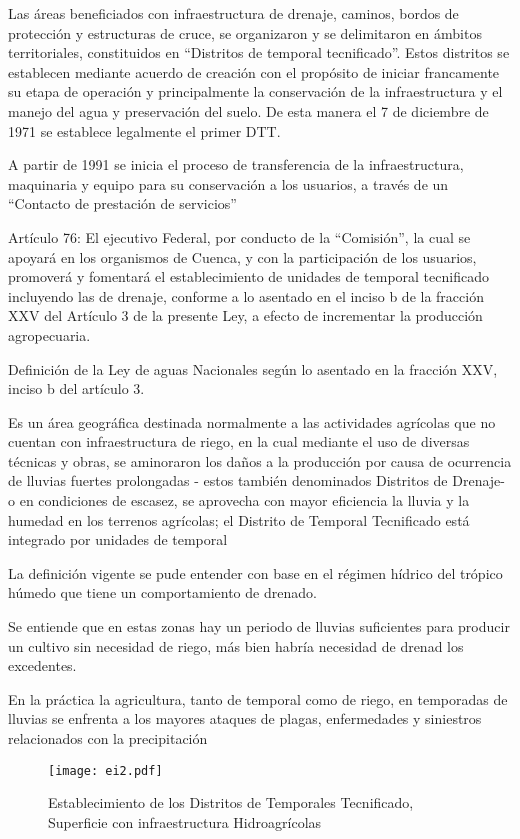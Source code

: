 Las áreas beneficiados con infraestructura de drenaje, caminos, bordos de protección y estructuras de cruce, se organizaron y se delimitaron en ámbitos territoriales, constituidos en ``Distritos de temporal tecnificado''. Estos distritos se establecen mediante acuerdo de creación con el propósito de iniciar francamente su etapa de operación y principalmente la conservación de la infraestructura y el manejo del agua y preservación del suelo. De esta manera el 7 de diciembre de 1971 se establece legalmente el primer DTT.

A partir de 1991 se inicia el proceso de transferencia de la infraestructura, maquinaria y equipo para su conservación a los usuarios, a través de un ``Contacto de prestación de servicios''

Artículo 76: El ejecutivo Federal, por conducto de la ``Comisión'', la cual se apoyará en los organismos de Cuenca, y con la  participación de los usuarios, promoverá y fomentará el establecimiento de unidades de temporal tecnificado incluyendo las de drenaje, conforme a lo asentado en el inciso b de la fracción XXV del Artículo 3 de la presente Ley, a efecto de incrementar la producción agropecuaria.

Definición de la Ley de aguas Nacionales según lo asentado en la fracción XXV, inciso b del artículo 3.

\begin{definition}
    Es un área geográfica destinada normalmente a las actividades agrícolas que no cuentan con infraestructura de riego, en la cual mediante el uso de diversas técnicas y obras, se aminoraron los daños a la producción por causa de ocurrencia de lluvias fuertes prolongadas - estos también denominados Distritos de Drenaje- o en condiciones de escasez, se aprovecha con mayor eficiencia la lluvia y la humedad en los terrenos agrícolas; el Distrito de Temporal Tecnificado está integrado por unidades de temporal
\end{definition}
La definición vigente se pude entender con base en el régimen hídrico del trópico húmedo que tiene un comportamiento de drenado.

Se entiende que en estas zonas hay un periodo de lluvias suficientes para producir un cultivo sin necesidad de riego, más bien habría necesidad de drenad los excedentes.

En la práctica la agricultura, tanto de temporal como de riego, en temporadas de lluvias se enfrenta a los mayores ataques de plagas, enfermedades y siniestros relacionados con la precipitación
\begin{figure}[h!]
\centering
  \texttt{[image: ei2.pdf]}
  \caption{Establecimiento de los Distritos de Temporales Tecnificado, Superficie con infraestructura Hidroagrícolas}
  \label{ie2}
\end{figure}

